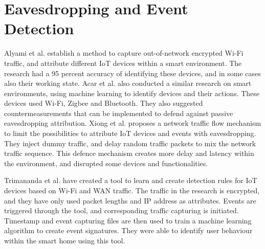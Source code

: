 \section{Eavesdropping and Event Detection}
Alyami et al. \cite{Eavs_relat_alyami2022wifi} establish a method to capture out-of-network encrypted \gls{Wi-Fi} traffic, and attribute different \gls{IoT} devices within a smart environment. The research had a 95 percent accuracy of identifying these devices, and in some cases also their working state. Acar et al. \cite{evas_relat_acar2020peek} also conducted a similar research on smart environments, using machine learning to identify devices and their actions. These devices used \gls{Wi-Fi}, Zigbee and Bluetooth. They also suggested countermeasurements that can be implemented to defend against passive eavesdropping attribution.
Xiong et al. \cite{evas_relat_xiong2022network} proposes a network traffic flow mechanism to limit the possibilities to attribute \gls{IoT} devices and events with eavesdropping. They inject dummy traffic, and delay random traffic packets to mix the network traffic sequence. This defence mechanism creates more delay and latency within the environment, and disrupted some devices and functionalities.

Trimananda et al. \cite{pingpong_trimananda2020packet} have created a tool to learn and create detection rules for \gls{IoT} devices based on \gls{Wi-Fi} and \gls{WAN} traffic. The traffic in the research is encrypted, and they have only used packet lengths and \gls{IP} address as attributes. Events are triggered through the tool, and corresponding traffic capturing is initiated. Timestamp and event capturing files are then used to train a machine learning algorithm to create event signatures. They were able to identify user behaviour within the smart home using this tool. 


